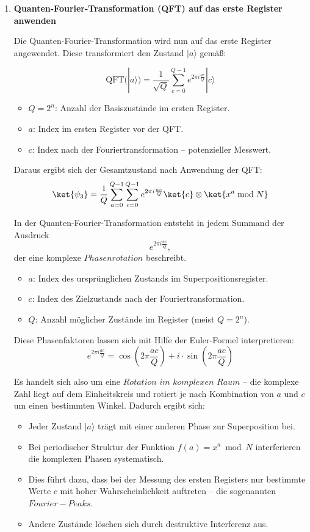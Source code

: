{\begin{enumerate}
\item \textbf{Quanten-Fourier-Transformation (QFT) auf das erste Register anwenden}

\noindent Die Quanten-Fourier-Transformation wird nun auf das erste Register angewendet. Diese transformiert den Zustand \( |a\rangle \) gemäß:

\[
\mathrm{QFT}(|a\rangle) = \frac{1}{\sqrt{Q}} \sum_{c=0}^{Q-1} e^{2\pi i \frac{a c}{Q}} |c\rangle
\]

\begin{itemize}
    \item \( Q = 2^n \): Anzahl der Basiszustände im ersten Register.
    \item \( a \): Index im ersten Register vor der QFT.
    \item \( c \): Index nach der Fouriertransformation – potenzieller Messwert.
\end{itemize}

\noindent Daraus ergibt sich der Gesamtzustand nach Anwendung der QFT:
\[
\ket{\psi_3} = \frac{1}{Q} \sum_{a=0}^{Q-1} \sum_{c=0}^{Q-1} e^{2\pi i \frac{a c}{Q}} \ket{c} \otimes \ket{x^a \bmod N}
\]

\noindent In der Quanten-Fourier-Transformation entsteht in jedem Summand der Ausdruck
\[
e^{2\pi i \frac{a c}{Q}},
\]
der eine komplexe \(Phasenrotation\) beschreibt.

\begin{itemize}
    \item \textbf{\( a \)}: Index des ursprünglichen Zustands im Superpositionsregister.
    \item \textbf{\( c \)}: Index des Zielzustands nach der Fouriertransformation.
    \item \textbf{\( Q \)}: Anzahl möglicher Zustände im Register (meist \( Q = 2^n \)).
\end{itemize}

\noindent Diese Phasenfaktoren lassen sich mit Hilfe der Euler-Formel interpretieren:
\[
e^{2\pi i \frac{a c}{Q}} = \cos\left(2\pi \frac{a c}{Q}\right) + i \cdot \sin\left(2\pi \frac{a c}{Q}\right)
\]

\noindent Es handelt sich also um eine \(Rotation\) \(im\) \(komplexen\) \(Raum\) – die komplexe Zahl liegt auf dem Einheitskreis und rotiert je nach Kombination von \( a \) und \( c \) um einen bestimmten Winkel. Dadurch ergibt sich:

\begin{itemize}
    \item Jeder Zustand \( |a\rangle \) trägt mit einer anderen Phase zur Superposition bei.
    \item Bei periodischer Struktur der Funktion \( f(a) = x^a \bmod N \) interferieren die komplexen Phasen systematisch.
    \item Dies führt dazu, dass bei der Messung des ersten Registers nur bestimmte Werte \( c \) mit hoher Wahrscheinlichkeit auftreten – die sogenannten \(Fourier-Peaks\).
    \item Andere Zustände löschen sich durch destruktive Interferenz aus.
\end{itemize}


\end{enumerate}}
